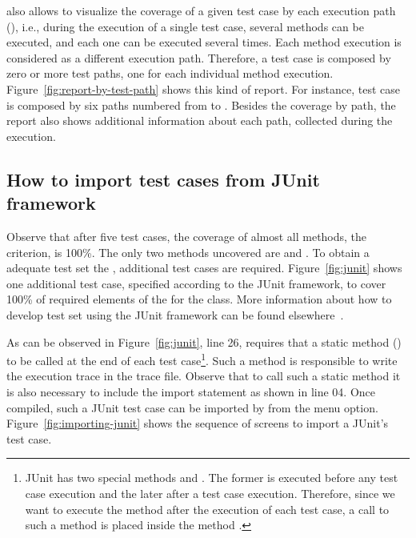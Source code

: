 \begin{sloppypar}
\toolname also allows to visualize the coverage of a given test
case by each execution path (), i.e., during the execution of a single test
case, several methods can be executed, and each one can be
executed several times. Each method execution is considered as a
different execution path. Therefore, a test case is composed by
zero or more test paths, one for each individual method execution.
Figure~\ref{fig:report-by-test-path} shows this kind of report.
For instance, test case  is composed by six paths
numbered from  to . Besides the coverage by
path, the report also shows additional information about each
path, collected during the execution.
\end{sloppypar}



\afterpage{\clearpage}
\newpage

\subsection{How to import test cases from JUnit framework}

Observe that after five test cases, the coverage of almost all
methods, \wrt the  criterion, is 100\%. The only
two methods uncovered are  and
. To obtain a adequate test set
\wrt the , additional test cases are required.
Figure~\ref{fig:junit} shows one additional test case, specified
according to the JUnit framework, to cover 100\% of required
elements of the  for the  class.
More information about how to develop test set using the JUnit
framework can be found
elsewhere~\cite{JUnit02UDCA,Rainsberger03JSGU}.



As can be observed in Figure~\ref{fig:junit}, line 26, \toolname
requires that a static method () to be
called at the end of each test case\footnote{JUnit has two special
methods  and . The
former is executed before any test case execution and the later
after a test case execution. Therefore, since we want to execute
the method  after the execution of each
test case, a call to such a method is placed inside the method
.}. Such a method is responsible to write
the execution trace in the trace file. Observe that to call such a
static method it is also necessary to include the import statement
as shown in line 04. Once compiled, such a JUnit test case can be
imported by \toolname from the  menu option. Figure~\ref{fig:importing-junit} shows
the sequence of screens to import a JUnit's test case.


